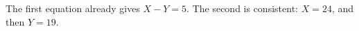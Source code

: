 The first equation already gives $\boxed{X-Y=5}$. The second is consistent: $X=24$, and then $Y=19$.
